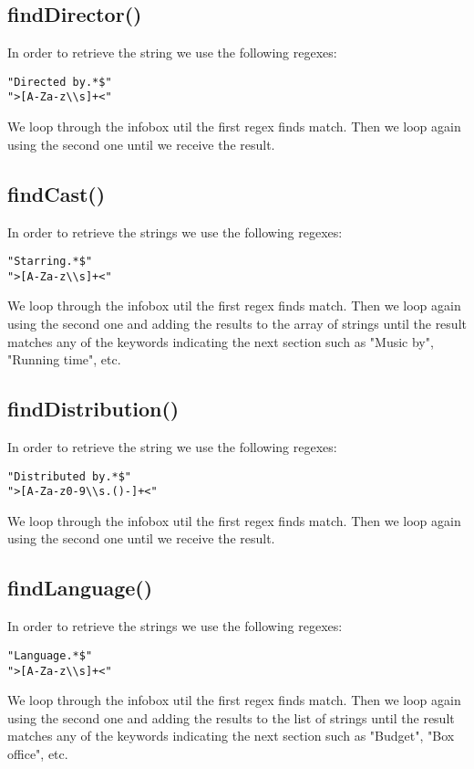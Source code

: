 \documentclass[a4paper,12pt]{article}
\begin{document}
\subsection{findDirector()}
In order to retrieve the string we use the following regexes:
\begin{lstlisting}
"Directed by.*$"
">[A-Za-z\\s]+<"
\end{lstlisting}
We loop through the infobox util the first regex finds match. Then we loop again using the second one until we receive the result.

\subsection{findCast()}
In order to retrieve the strings we use the following regexes:
\begin{lstlisting}
"Starring.*$"
">[A-Za-z\\s]+<"
\end{lstlisting}
We loop through the infobox util the first regex finds match. Then we loop again using the second one and adding the results to the array of strings until the result matches any of the keywords indicating the next section such as "Music by", "Running time", etc.

\subsection{findDistribution()}
In order to retrieve the string we use the following regexes:
\begin{lstlisting}
"Distributed by.*$"
">[A-Za-z0-9\\s.()-]+<"
\end{lstlisting}
We loop through the infobox util the first regex finds match. Then we loop again using the second one until we receive the result.

\subsection{findLanguage()}
In order to retrieve the strings we use the following regexes:
\begin{lstlisting}
"Language.*$"
">[A-Za-z\\s]+<"
\end{lstlisting}
We loop through the infobox util the first regex finds match. Then we loop again using the second one and adding the results to the list of strings until the result matches any of the keywords indicating the next section such as "Budget", "Box office", etc.
\end{document}
